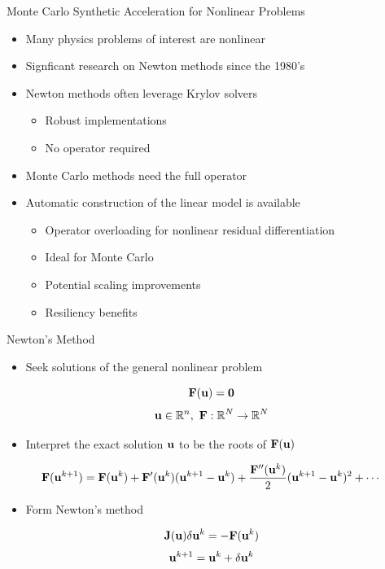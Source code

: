 \documentclass{beamer}
\begin{document}
\begin{frame}{Monte Carlo Synthetic Acceleration for Nonlinear Problems}

  \begin{itemize}
  \item Many physics problems of interest are nonlinear
    \bigskip
  \item Signficant research on Newton methods since the 1980's
    \bigskip
  \item Newton methods often leverage Krylov solvers
    \begin{itemize}
    \item Robust implementations
    \item No operator required
    \end{itemize}
    \bigskip
  \item Monte Carlo methods need the full operator
    \bigskip
  \item Automatic construction of the linear model is available
    \begin{itemize}
    \item Operator overloading for nonlinear residual differentiation
    \item Ideal for Monte Carlo
    \item Potential scaling improvements
    \item Resiliency benefits
    \end{itemize}
  \end{itemize}

\end{frame}

\begin{frame}{Newton's Method}

  \begin{itemize}
  \item Seek solutions of the general nonlinear problem
  \end{itemize}

  \[
  \mathbf{F}(\mathbf{u}) = \mathbf{0}
  \]
  \[
  \mathbf{u} \in \mathbb{R}^n,\ \mathbf{F}:\mathbb{R}^N \rightarrow
  \mathbb{R}^N
  \]

  \begin{itemize}
  \item Interpret the exact solution $\mathbf{u}$ to be the roots of
    $\mathbf{F}(\mathbf{u})$
  \end{itemize}

  \[
  \mathbf{F}(\mathbf{u}^{k+1}) = \mathbf{F}(\mathbf{u}^{k}) +
  \mathbf{F}'(\mathbf{u}^{k})(\mathbf{u}^{k+1}-\mathbf{u}^{k}) +
  \frac{\mathbf{F}''(\mathbf{u}^{k})}{2}(\mathbf{u}^{k+1}-\mathbf{u}^{k})^2 + \cdots
  \]

  \begin{itemize}
  \item Form Newton's method
  \end{itemize}
  \[
  \mathbf{J}(\mathbf{u}) \delta \mathbf{u}^k = -\mathbf{F}(\mathbf{u}^{k})
  \]
  \[
  \mathbf{u}^{k+1} = \mathbf{u}^k + \delta \mathbf{u}^k
  \]

\end{frame}
\end{document}
